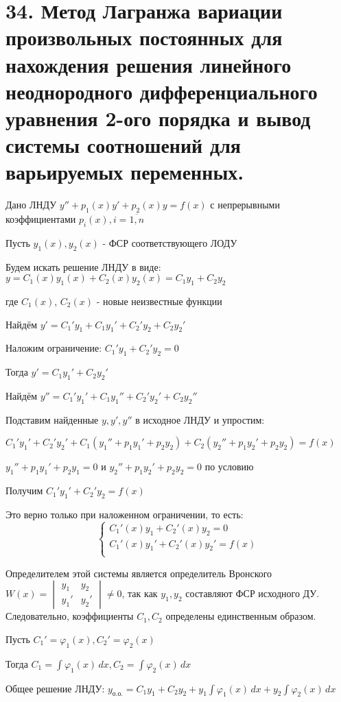\documentclass[11pt]{article}
\begin{document}
\section*{34. Метод Лагранжа вариации произвольных постоянных для нахождения решения линейного неоднородного дифференциального уравнения 2-ого порядка и вывод системы соотношений для варьируемых переменных.}
\par Дано ЛНДУ $y'' + p_{1}(x)y' + p_{2}(x)y = f(x)$ с непрерывными коэффициентами $p_{i}(x), i = \overline{1, n}$
\par Пусть $y_{1}(x), y_{2}(x)$ - ФСР соответствующего ЛОДУ
\par Будем искать решение ЛНДУ в виде: $y = C_{1}(x)y_{1}(x) + C_{2}(x)y_{2}(x) = C_{1}y_{1} + C_{2}y_{2}$
\par где $C_{1}(x)$, $C_{2}(x)$ - новые неизвестные функции
\par Найдём $y' = C_{1}'y_{1} + C_{1}y_{1}' + C_{2}'y_{2} + C_{2}y_{2}'$
\par Наложим ограничение: $C_{1}'y_{1} + C_{2}'y_{2} = 0$
\par Тогда $y' = C_{1}y_{1}' + C_{2}y_{2}'$
\par Найдём $y'' = C_{1}'y_{1}' + C_{1}y_{1}'' + C_{2}'y_{2}' + C_{2}y_{2}''$
\par Подставим найденные $y, y', y''$ в исходное ЛНДУ и упростим:
\par $C_{1}'y_{1}' + C_{2}'y_{2}' + C_{1}(y_{1}'' + p_{1}y_{1}' + p_{2}y_{2}) + C_{2}(y_{2}'' + p_{1}y_{2}' + p_{2}y_{2}) = f(x)$
\par $y_{1}'' + p_{1}y_{1}' + p_{2}y_{1} = 0$ и $y_{2}'' + p_{1}y_{2}' + p_{2}y_{2} = 0$ по условию
\par Получим $C_{1}'y_{1}' + C_{2}'y_{2} = f(x)$
\par Это верно только при наложенном ограничении, то есть:$$\left\{\begin{array}{l}
C_{1}'(x)y_{1} + C_{2}'(x)y_{2} = 0 \\
C_{1}'(x)y_{1}' + C_{2}'(x)y_{2}' = f(x) \\
\end{array}\right.$$
\par Определителем этой системы является определитель Вронского $W(x) = \begin{vmatrix}{} y_{1} & y_{2} \\ y_{1}' & y_{2}' \end{vmatrix} \neq 0$, так как $y_{1}, y_{2}$ составляют ФСР исходного ДУ. Следовательно, коэффициенты $C_{1}, C_{2}$ определены единственным образом.
\par Пусть $C_{1}' = \varphi_{1}(x), C_{2}' = \varphi_{2}(x)$
\par Тогда $C_{1} = \int \varphi_{1}(x) \, dx, C_{2} = \int \varphi_{2} (x)\, dx$
\par Общее решение ЛНДУ: $y_{\text{о.о.}} = C_{1}y_{1} + C_{2}y_{2} + y_{1}\int \varphi_{1}(x) \, dx + y_{2} \int \varphi_{2}(x) \, dx$
\end{document}

